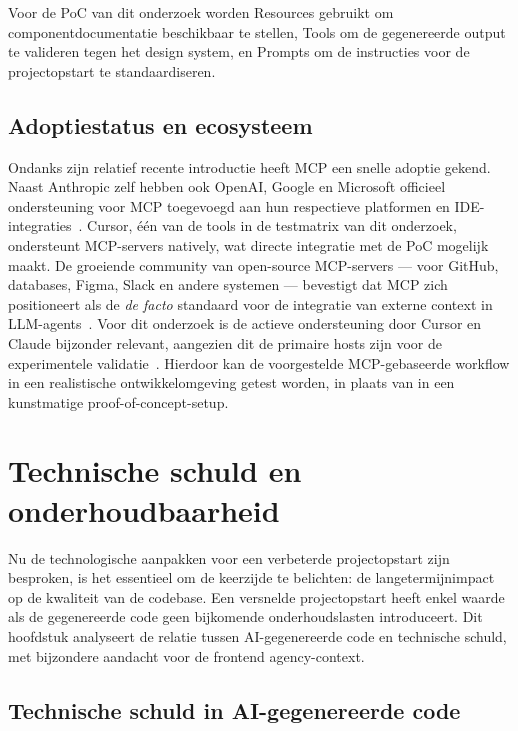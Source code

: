 Voor de PoC van dit onderzoek worden Resources gebruikt om componentdocumentatie beschikbaar te stellen, Tools om de gegenereerde output te valideren tegen het design system, en Prompts om de instructies voor de projectopstart te standaardiseren.

\subsection{Adoptiestatus en ecosysteem}
\label{subsec:mcp-adoptie}

Ondanks zijn relatief recente introductie heeft MCP een snelle adoptie gekend. Naast Anthropic zelf hebben ook OpenAI, Google en Microsoft officieel ondersteuning voor MCP toegevoegd aan hun respectieve platformen en IDE-integraties~\autocite{GoogleCloud2024,OpenAIMCP2025,MicrosoftMCP2025}. Cursor, één van de tools in de testmatrix van dit onderzoek, ondersteunt MCP-servers natively, wat directe integratie met de PoC mogelijk maakt. De groeiende community van open-source MCP-servers --- voor GitHub, databases, Figma, Slack en andere systemen --- bevestigt dat MCP zich positioneert als de \textit{de facto} standaard voor de integratie van externe context in LLM-agents~\autocite{Descope2025}. Voor dit onderzoek is de actieve ondersteuning door Cursor en Claude bijzonder relevant, aangezien dit de primaire hosts zijn voor de experimentele validatie~\autocite{GoogleCloud2024,DescopeMCP2025}. Hierdoor kan de voorgestelde MCP-gebaseerde workflow in een realistische ontwikkelomgeving getest worden, in plaats van in een kunstmatige proof-of-concept-setup.

\section{Technische schuld en onderhoudbaarheid}
\label{sec:technische-schuld}

Nu de technologische aanpakken voor een verbeterde projectopstart zijn besproken, is het essentieel om de keerzijde te belichten: de langetermijnimpact op de kwaliteit van de codebase. Een versnelde projectopstart heeft enkel waarde als de gegenereerde code geen bijkomende onderhoudslasten introduceert. Dit hoofdstuk analyseert de relatie tussen AI-gegenereerde code en technische schuld, met bijzondere aandacht voor de frontend agency-context.

\subsection{Technische schuld in AI-gegenereerde code}
\label{subsec:schuld-ai-code}

